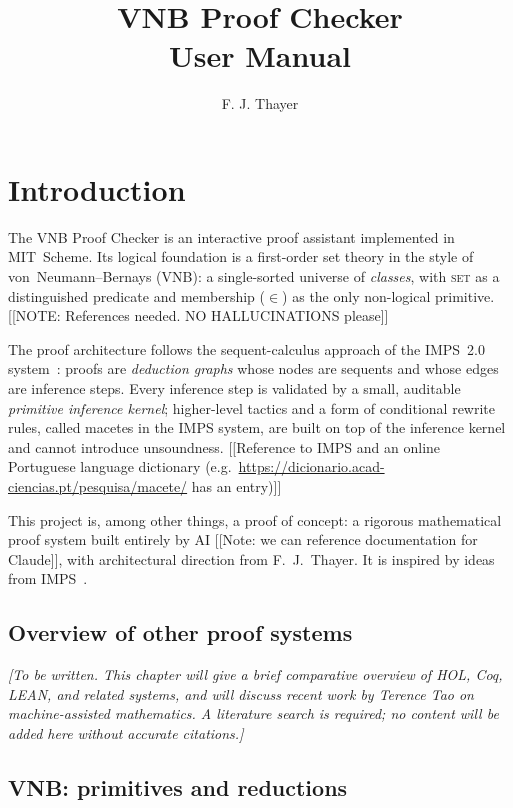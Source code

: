 \documentclass{amsbook}[openany]
\title{\textbf{VNB Proof Checker}\\[4pt]
       \large User Manual}
\author{F. J. Thayer}
\date{}
\theoremstyle{definition}
\theoremstyle{remark}
\theoremstyle{remark}
\begin{document}
\maketitle
\tableofcontents
\newpage

\chapter{Introduction}

The VNB Proof Checker is an interactive proof assistant implemented in
MIT~Scheme.  Its logical foundation is a first-order set theory in the
style of von~Neumann--Bernays (VNB): a single-sorted universe of
\emph{classes}, with \textsc{set} as a distinguished predicate and
membership ($\in$) as the only non-logical primitive.
[[NOTE: References needed. NO HALLUCINATIONS please]]

The proof architecture follows the sequent-calculus approach of the
IMPS~2.0 system~\cite{IMPS}: proofs are \emph{deduction graphs} whose
nodes are sequents and whose edges are inference steps.  Every
inference step is validated by a small, auditable \emph{primitive
inference kernel}; higher-level tactics and a form of conditional
rewrite rules, called macetes in the IMPS system, are built on top of
the inference kernel and cannot introduce unsoundness.
[[Reference to IMPS and an online Portuguese language dictionary
(e.g.\ \url{https://dicionario.acad-ciencias.pt/pesquisa/macete/} has
an entry)]]

This project is, among other things, a proof of concept: a rigorous
mathematical proof system built entirely by AI
[[Note: we can reference documentation for Claude]],
with architectural direction from F.~J.~Thayer.  It is inspired by
ideas from IMPS~\cite{IMPS}.

\section{Overview of other proof systems}
\label{sec:other-systems}

\emph{[To be written.  This chapter will give a brief comparative
overview of HOL, Coq, LEAN, and related systems, and will discuss
recent work by Terence Tao on machine-assisted mathematics.  A
literature search is required; no content will be added here without
accurate citations.]}

\section{VNB: primitives and reductions}
\label{sec:enriched}
\end{document}
